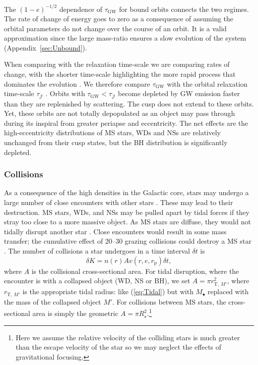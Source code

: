 \documentclass[useAMS,usedcolumn,usegraphicx,usenatbib]{mn2e}
\newcommand{\eqnref}[1]{(\ref{eq:#1})}
\newcommand{\apref}[1]{Appendix~\ref{sec:#1}}
\newcommand{\sub}[1]{\ensuremath{_\mathrm{#1}}}
\begin{document}
The $(1-e)^{-1/2}$ dependence of $\tau\sub{GW}$ for bound orbits connects the two regimes. The rate of change of energy goes to zero as a consequence of assuming the orbital parameters do not change over the course of an orbit. It is a valid approximation since the large mass-ratio ensures a slow evolution of the system (\apref{Unbound}).

When comparing with the relaxation time-scale we are comparing rates of change, with the shorter time-scale highlighting the more rapid process that dominates the evolution \citep{Amaro-Seoane2007}. We therefore compare $\tau\sub{GW}$ with the orbital relaxation time-scale $\tau_\mathcal{J}$ \citep{Merritt2011}. Orbits with $\tau\sub{GW} < \tau_\mathcal{J}$ become depleted by GW emission faster than they are replenished by scattering. The cusp does not extend to these orbits. Yet, these orbits are not totally depopulated as an object may pass through during its inspiral from greater periapse and eccentricity. The net effects are the high-eccentricity distributions of MS stars, WDs and NSs are relatively unchanged from their cusp states, but the BH distribution is significantly depleted.

\subsubsection{Collisions}\label{sec:Collision}

As a consequence of the high densities in the Galactic core, stars may undergo a large number of close encounters with other stars \citep{Cohn1978}. These may lead to their destruction. MS stars, WDs, and NSs may be pulled apart by tidal forces if they stray too close to a more massive object. As MS stars are diffuse, they would not tidally disrupt another star \citep{Murphy1991,Freitag2005}. Close encounters would result in some mass transfer; the cumulative effect of $20$--$30$ grazing collisions could destroy a MS star \citep{Freitag2006}. The number of collisions a star undergoes in a time interval $\delta t$ is
\begin{equation}
\delta K = n(r) A v(r,e,r\sub{p})\delta t,
\end{equation}
where $A$ is the collisional cross-sectional area. For tidal disruption, where the encounter is with a collapsed object (WD, NS or BH), we set $A = \pi r_{\mathrm{T},\,{M'}}^2$, where $r_{\mathrm{T},\,{M'}}$ is the appropriate tidal radius: like \eqnref{Tidal} but with $M_\bullet$ replaced with the mass of the collapsed object $M'$. For collisions between MS stars, the cross-sectional area is simply the geometric $A = \pi R_\star^2$.\footnote{Here we assume the relative velocity of the colliding stars is much greater than the escape velocity of the star so we may neglect the effects of gravitational focusing.}
\end{document}
